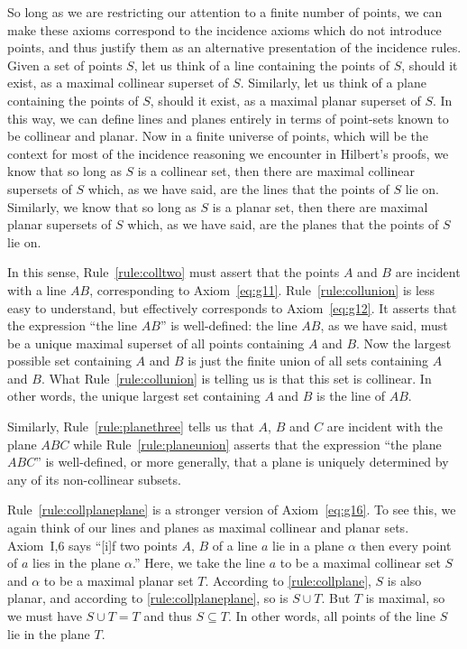 So long as we are restricting our attention to a finite number of points, we can make these axioms correspond to the incidence axioms which do not introduce points, and thus justify them as an alternative presentation of the incidence rules. Given a set of points $S$, let us think of a line containing the points of $S$, should it exist, as a maximal collinear superset of $S$. Similarly, let us think of a plane containing the points of $S$, should it exist, as a maximal planar superset of $S$. In this way, we can define lines and planes entirely in terms of point-sets known to be collinear and planar. Now in a finite universe of points, which will be the context for most of the incidence reasoning we encounter in Hilbert's proofs, we know that so long as $S$ is a collinear set, then there are maximal collinear supersets of $S$ which, as we have said, are the lines that the points of $S$ lie on. Similarly, we know that so long as $S$ is a planar set, then there are maximal planar supersets of $S$ which, as we have said, are the planes that the points of $S$ lie on.

In this sense, Rule~\ref{rule:colltwo} must assert that the points $A$ and $B$ are incident with a line $AB$, corresponding to Axiom~\ref{eq:g11}. Rule~\ref{rule:collunion} is less easy to understand, but effectively corresponds to Axiom~\ref{eq:g12}. It asserts that the expression ``the line $AB$'' is well-defined: the line $AB$, as we have said, must be a unique maximal superset of all points containing $A$ and $B$. Now the largest possible set containing $A$ and $B$ is just the finite union of all sets containing $A$ and $B$. What Rule~\ref{rule:collunion} is telling us is that this set is collinear. In other words, the unique largest set containing $A$ and $B$ is the line of $AB$.

Similarly, Rule~\ref{rule:planethree} tells us that $A$, $B$ and $C$ are incident with the plane $ABC$ while Rule~\ref{rule:planeunion} asserts that the expression ``the plane $ABC$'' is well-defined, or more generally, that a plane is uniquely determined by any of its non-collinear subsets.

Rule~\ref{rule:collplaneplane} is a stronger version of Axiom~\ref{eq:g16}. To see this, we again think of our lines and planes as maximal collinear and planar sets. Axiom~I,6 says ``[i]f two points $A$, $B$ of a line $a$ lie in a plane $\alpha$ then every point of $a$ lies in the plane $\alpha$.'' Here, we take the line $a$ to be a maximal collinear set $S$ and $\alpha$ to be a maximal planar set $T$. According to \ref{rule:collplane}, $S$ is also planar, and according to \ref{rule:collplaneplane}, so is $S \cup T$. But $T$ is maximal, so we must have $S \cup T = T$ and thus $S \subseteq T$. In other words, all points of the line $S$ lie in the plane $T$.

